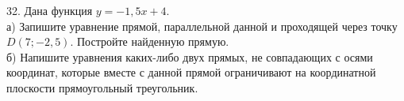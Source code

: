 32. Дана функция $y=-1,5x+4.$\\
а) Запишите уравнение прямой, параллельной данной и проходящей через точку $D(7;-2,5).$ Постройте найденную прямую.\\
б) Напишите уравнения каких-либо двух прямых, не совпадающих с осями координат, которые вместе с данной прямой ограничивают на координатной плоскости прямоугольный треугольник.\\
